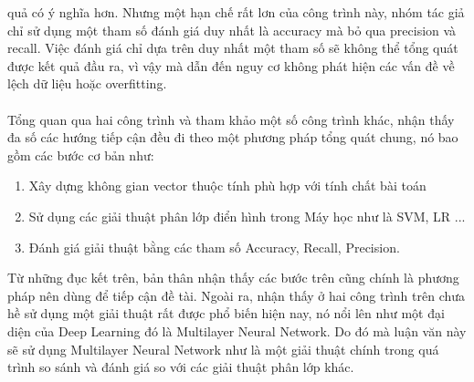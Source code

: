 quả có ý nghĩa hơn. Nhưng một hạn chế rất lơn của công trình này, nhóm tác giả 
chỉ sử dụng một tham số đánh giá duy nhất là accuracy mà bỏ qua precision và 
recall. Việc đánh giá chỉ dựa trên duy nhất một tham số sẽ không thể tổng quát 
được kết quả đầu ra, vì vậy mà dẫn đến nguy cơ không phát hiện các vấn đề về 
lệch dữ liệu hoặc overfitting.\\\\ 
Tổng quan qua hai công trình và tham khảo một số công trình khác, nhận thấy 
đa số các hướng tiếp cận đều đi theo một phương pháp tổng quát chung, nó bao gồm các bước 
cơ bản như:
\begin{enumerate}
\item Xây dựng không gian vector thuộc tính phù hợp với tính chất bài toán
\item Sử dụng các giải thuật phân lớp điển hình trong Máy học như là 
SVM, LR ...
\item Đánh giá giải thuật bằng các tham số Accuracy, Recall, Precision.
\end{enumerate}
Từ những đục kết trên, bản thân nhận thấy các bước trên cũng chính là phương pháp 
nên dùng để tiếp cận đề tài. Ngoài ra, nhận thấy ở hai công trình trên chưa 
hề sử dụng một giải thuật rất được phổ biến hiện nay, nó nổi lên như một đại 
diện của Deep Learning đó là Multilayer Neural Network. Do đó mà luận văn này sẽ sử dụng 
Multilayer Neural Network như là một giải thuật chính trong quá trình so sánh 
và đánh giá so với các giải thuật phân lớp khác.
